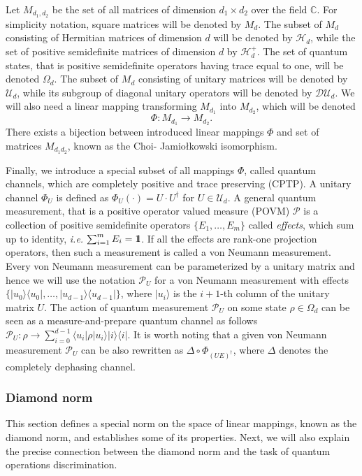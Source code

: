 \documentclass[preprint,12pt, a4paper]{elsarticle}
\newcommand{\ie}{{\emph{i.e.\/}}}
\newcommand{\ket}[1]{\ensuremath{|#1\rangle}}
\newcommand{\bra}[1]{\ensuremath{\langle#1|}}
\newcommand{\ketbra}[2]{\ensuremath{\ket{#1}\bra{#2}}}
\newcommand{\proj}[1]{\ensuremath{\ketbra{#1}{#1}}}
\newcommand{\1}{{\rm 1\hspace{-0.9mm}l}}
\newcommand{\DD}{\mathcal{D}}
\newcommand{\PP}{\mathcal{P}}
\newcommand{\UU}{\mathcal{U}}
\newcommand{\HH}{\mathcal{H}}
\begin{document}
Let $M_{d_1,d_2}$ be the set of all matrices of dimension $d_1 \times d_2$ over
the field $\mathbb{C}$. For  simplicity notation, square matrices will be 
denoted by
$M_d$.  The subset of $M_d$ consisting of Hermitian matrices of dimension $d$ 
will  be  denoted  by $\HH_d$,  while  the  set  of  positive semidefinite 
matrices of dimension $d$ by $\HH_d^+$. The set of quantum states, that is 
positive semidefinite operators having
trace equal to one, will be denoted $\Omega_d$.  The subset of $M_d$ consisting of 
unitary matrices will be denoted by
$\UU_d$, while its subgroup of diagonal unitary operators will be denoted by
$\DD \UU_d$.  We will also need a linear
mapping transforming $M_{d_1}$ into $M_{d_2}$, which will be denoted \begin{equation}
\Phi: M_{d_1 } \rightarrow M_{d_2}.
\end{equation} 
There
exists a bijection between introduced linear mappings $\Phi$ and set of matrices $M_{d_1d_2}$,  known as the Choi-
Jamio{\l}kowski isomorphism. 


Finally, we introduce a special subset of all mappings $\Phi$, called quantum channels, which are completely positive
and trace preserving (CPTP).
A unitary channel
$\Phi_{U}$ is defined as $\Phi_U(\cdot) = U \cdot U^\dagger$ for  $U \in 
\UU_d$. A general quantum
measurement, that is a positive operator valued measure (POVM) $\PP$ is a
collection of positive semidefinite operators $\{E_1, \ldots, E_m \}$ called
\emph{effects}, which sum up to identity, \ie $ \, \, \sum_{i=1}^m E_i = \1$. If
all the effects are rank-one projection operators, then such a measurement is
called a von Neumann measurement. Every von Neumann measurement can be
parameterized by a unitary matrix and hence we will use the notation $\PP_{U}$
for a von Neumann measurement with effects $\{\proj{u_0}, \ldots, \proj{u_{d-1}}\}$,
where $\ket{u_i}$ is the $i+1$-th column of the unitary matrix $U$. The action of
quantum measurement $\PP_{U}$ on some state $\rho \in \Omega_d$ can be
seen as  a measure-and-prepare quantum channel as follows 
$
\PP_{U} : \rho \rightarrow \sum_{i=0}^{d-1} \bra{u_i} \rho \ket{u_i} \proj{i}.
$ It is worth noting that a given  von Neumann measurement  $\PP_{U}$ can be also rewritten as $\Delta 
\circ \Phi_{(UE)^\dagger}$, where $\Delta$ denotes the completely dephasing 
channel.  


\subsubsection{Diamond norm}
This section defines a special norm on the space of linear mappings, known as the diamond norm,
and establishes some of its properties. 
Next, we will also explain the precise connection between the diamond
norm and the task of quantum operations discrimination. 
\end{document}
